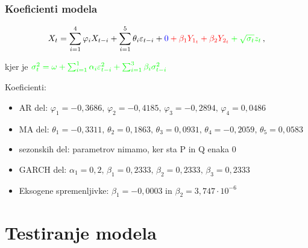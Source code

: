 \documentclass[14p, hyperref={unicode}]{beamer}
\begin{document}
\begin{frame}
    
    \frametitle{Koeficienti modela} 

    \small
    \begin{equation*}
        X_t = \sum_{i=1}^{4}{\varphi_i X_{t-i}} + \sum_{i=1}^{5}{\theta_i \varepsilon_{t-i}} + \color{blue} 0  \color{red}  + \beta_1 Y_{1_{t}} + \beta_2 Y_{2_{t}} \color{green} + \sqrt{\sigma_t} z_t \color{black} \,,
    \end{equation*}

    kjer je $\color{green} \sigma^2_t = \omega + \sum_{i=1}^{1}{\alpha_i \varepsilon_{t-i}^2} + \sum_{i=1}^{3}{\beta_i \sigma_{t-i}^2} \,$
    \normalsize

    \vfill

    Koeficienti:

    \begin{itemize}
        \item  AR del: $\varphi_1 = -0{,}3686,\, \varphi_2 = -0{,}4185,\, \varphi_3 = -0{,2894},\, \varphi_4 = 0{,0486}$
        \item  MA del: $\theta_1 = - 0{,}3311,\, \theta_2 = 0{,}1863,\, \theta_3 = 0{,}0931,\, \theta_4 = -0{,}2059,\, \theta_5 = 0{,}0583$
        \item  sezonskih del: parametrov nimamo, ker sta P in Q enaka $0$
        \item  GARCH del: $\alpha_1 = 0{,}2,\, \beta_1 = 0{,}2333,\, \beta_2 = 0{,}2333,\, \beta_3 = 0{,}2333$
        \item  Eksogene spremenljivke: $\beta_1 = -0{,}0003$ in $\beta_2 = 3{,}747 \cdot 10^{-6}$ 
    \end{itemize}

\end{frame}




\section{Testiranje modela}


\end{document}
